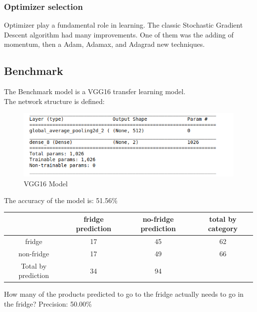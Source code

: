 \documentclass[a4paper,10pt]{article}
\begin{document}
\subsubsection{Optimizer selection}

Optimizer play a fundamental role in learning. The classic Stochastic Gradient Descent algorithm had many improvements. One of them was the adding of momentum, then a Adam, Adamax, and Adagrad new techniques. \\


\subsection{Benchmark}


The Benchmark model is a VGG16 transfer learning model. \\ 

The network structure is defined:  \\

\begin{figure}[h]
  \includegraphics[width=\linewidth]{vgg16_model.png}
  \caption{VGG16 Model}
\end{figure}


The accuracy of the model is: 51.56\%

\begin{center}
\begin{tabular}{ |c|c|c|c| } 
 \hline
       & fridge prediction & no-fridge prediction & total by category \\ 
 \hline
 fridge & 17 & 45 & 62 \\ 
 non-fridge & 17 & 49 & 66 \\ 
 \hline
 Total by prediction & 34 & 94 & \\ 
 \hline
 
\end{tabular}
\end{center}

How many of the products predicted to go to the fridge actually needs to go in the fridge?
Precision: 50.00\% \\
\end{document}
